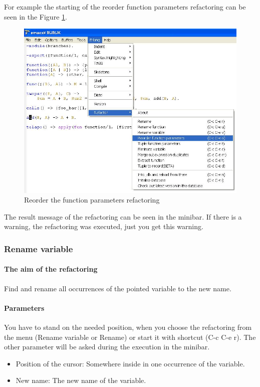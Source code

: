 \documentclass[12pt]{article}
\begin{document}
For example the starting of the reorder function parameters refactoring can be seen in the Figure \ref{reorder}.

\begin{center}
\begin{figure}[htbp]

    \includegraphics[scale=0.60]{reorder.jpg}
   \caption{Reorder the function parameters refactoring}
  \label{reorder}
\end{figure}
\end{center}
The result message of the refactoring can be seen in the minibar. If there is a warning, the refactoring was executed, just you get this warning.


\subsubsection{Rename variable}
\paragraph{The aim of the refactoring}
Find and rename all occurrences of the pointed variable to the new name.
\paragraph{Parameters}
You have to stand on the needed position, when you choose the refactoring from 
the menu (Rename variable or Rename) or start it with shortcut (C-c C-e r).
The other parameter will be asked during the execution in the minibar.
\begin{itemize}
	\item Position of the cursor: Somewhere inside in one occurrence of the variable.
	\item New name: The new name of the variable. 
\end{itemize}
\end{document}
